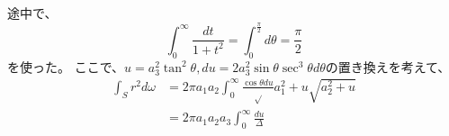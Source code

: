 \documentclass{jsarticle}
\newcommand{\beq}{\begin{equation}}
\newcommand{\eeq}{\end{equation}}
\newcommand{\tandt}{\tan^2\theta}
\begin{document}
途中で、
\beq
\int_0^{\infty} \frac{dt}{1+t^2} = \int_0^{\frac{\pi}{2}} d\theta= \frac{\pi}{2}
\eeq
を使った。
ここで、$u = a_3^2 \tandt, du = 2a_3^2 \sin\theta \sec^3\theta d\theta$の置き換えを考えて、
\begin{align}
    \int_S r^2 d\omega &= 2\pi a_1 a_2 \int_0^\infty \frac{\cos\theta du}\sqrt{a_1^2 + u}\sqrt{a_2^2 + u}\\
                       &= 2 \pi a_1 a_2 a_3 \int_0^\infty \frac{du}{\Delta}
\end{align}
\end{document}
